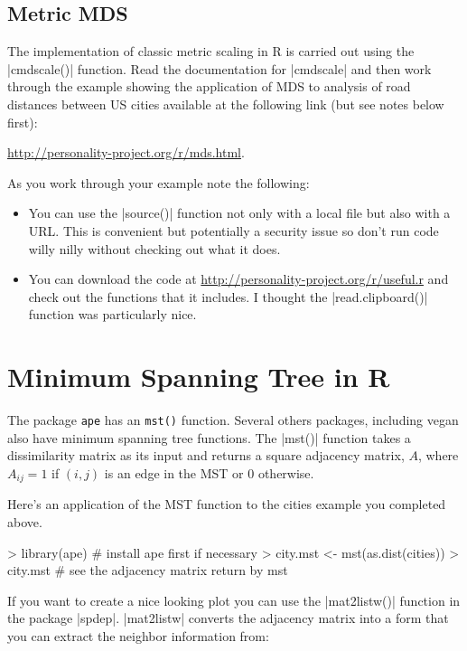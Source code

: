 \subsection*{Metric MDS}

The implementation of classic metric scaling in R is carried out using the |cmdscale()| function. Read the documentation for |cmdscale| and then work through the example showing the application of MDS to analysis of road distances between US cities available at the following link (but see notes below first):

\href{http://personality-project.org/r/mds.html}{http://personality-project.org/r/mds.html}.

\medskip
As you work through your example note the following:

\begin{itemize}
\item You can use the |source()| function not only with a local file but also with a URL.  This is convenient but potentially a security issue so don't run code willy nilly without checking out what it does.

\item You can download the code at \href{http://personality-project.org/r/useful.r}{http://personality-project.org/r/useful.r} and check out the functions that it includes. I thought the |read.clipboard()| function was particularly nice.
\end{itemize}


\section*{Minimum Spanning Tree in R}

The package \texttt{ape} has an \texttt{mst()} function. Several others packages, including vegan also have minimum spanning tree functions. The |mst()| function takes a dissimilarity matrix as its input and returns a square adjacency matrix, $A$, where $A_{ij} = 1$ if $(i,j)$ is an edge in the MST or 0 otherwise.

Here's an application of the MST function to the cities example you completed above.

\begin{Code}
> library(ape) # install ape first if necessary
> city.mst <- mst(as.dist(cities))
> city.mst # see the adjacency matrix return by mst
\end{Code}

If you want to create a nice looking plot you can use the  |mat2listw()| function in the package |spdep|. |mat2listw|  converts the adjacency matrix into a form that you can extract the neighbor information from:

